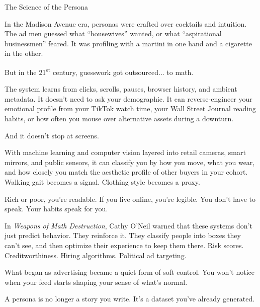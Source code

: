 \medskip

\begin{HistoricalSidebar}{The Science of the Persona}

  In the Madison Avenue era, personas were crafted over cocktails and intuition.  
  The ad men guessed what ``housewives'' wanted, or what ``aspirational businessmen'' feared.  
  It was profiling with a martini in one hand and a cigarette in the other.

  \medskip
  
  But in the 21\textsuperscript{st} century, guesswork got outsourced... to math.
  
  \medskip
  
  The system learns from clicks, scrolls, pauses, browser history, and ambient metadata.  
  It doesn’t need to ask your demographic. It can reverse-engineer your emotional profile from your TikTok watch time,  
  your Wall Street Journal reading habits, or how often you mouse over alternative assets during a downturn.

  \medskip
  
  And it doesn’t stop at screens.

  \medskip
  
  With machine learning and computer vision layered into retail cameras, smart mirrors, and public sensors,  
  it can classify you by how you move, what you wear, and how closely you match the aesthetic profile of other buyers 
  in your cohort.  
  Walking gait becomes a signal. Clothing style becomes a proxy.

  \medskip
  
  Rich or poor, you’re readable.  
  If you live online, you’re legible.  
  You don’t have to speak. Your habits speak for you.
  
  \medskip
  
  In \textit{Weapons of Math Destruction}, Cathy O’Neil warned that these systems don’t just predict behavior.  
  They reinforce it. They classify people into boxes they can’t see, and then optimize their experience  
  to keep them there. Risk scores. Creditworthiness. Hiring algorithms. Political ad targeting.
  
  \medskip
  
  What began as advertising became a quiet form of soft control.  You won’t notice when your feed starts 
  shaping your sense of what’s normal.
  
  \medskip
  
  A persona is no longer a story you write.  
  It’s a dataset you’ve already generated.
  
\end{HistoricalSidebar}
  
